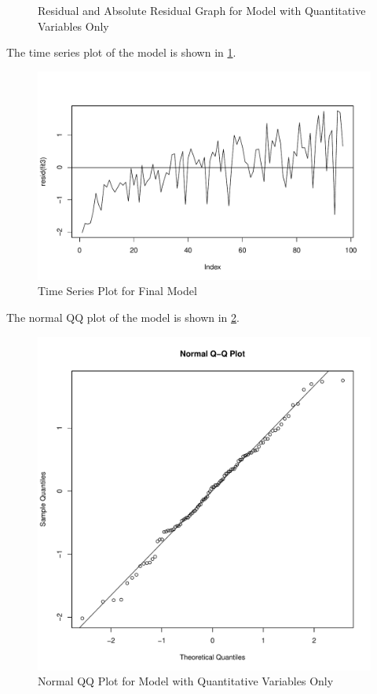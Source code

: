 \documentclass[12pt,letterpaper,titlepage,en-US]{article}
\begin{document}
\begin{figure}[H]
\begin{subfigure}[t]{0.5\textwidth}
    \end{subfigure}
    \caption{Residual and Absolute Residual Graph for Model with Quantitative Variables Only}
\end{figure}

The time series plot of the model is shown in \cref{timefit3}.
\begin{figure}[H]
    \centering
    \caption{Time Series Plot for Final Model}\label{timefit3}
    \includegraphics[width=.9\textwidth]{fig/plotfit3times.pdf}
\end{figure}

The normal QQ plot of the model is shown in \cref{qqfit3}.

\begin{figure}[H]
    \centering
    \caption{Normal QQ Plot for Model with Quantitative Variables Only}\label{qqfit3}
    \includegraphics[width=.85\textwidth]{fig/qqnormplotfit3.pdf}
\end{figure}
\end{document}
